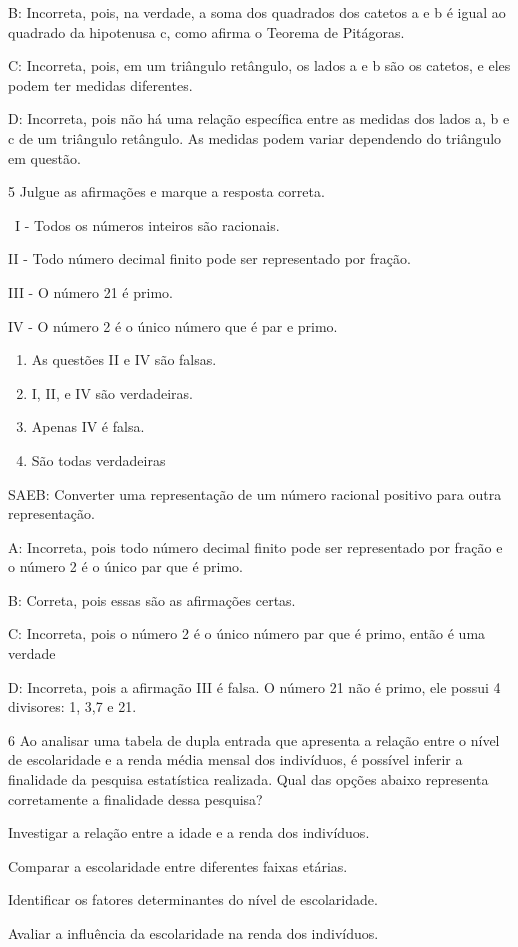 {B: Incorreta, pois, na verdade, a soma dos quadrados dos catetos a e b é
igual ao quadrado da hipotenusa c, como afirma o Teorema de Pitágoras.

C: Incorreta, pois, em um triângulo retângulo, os lados a e b são os
catetos, e eles podem ter medidas diferentes.

D: Incorreta, pois não há uma relação específica entre as medidas dos
lados a, b e c de um triângulo retângulo. As medidas podem variar
dependendo do triângulo em questão.

\num{5} Julgue as afirmações e marque a resposta correta.

~I - Todos os números inteiros são racionais.

II - Todo número decimal finito pode ser representado por fração.

III - O número 21 é primo.

IV - O número 2 é o único número que é par e primo.

\begin{enumerate}
\def\labelenumi{\alph{enumi})}
\item
  As questões II e IV são falsas.
\item
  I, II, e IV são verdadeiras.
\item
  Apenas IV é falsa.
\item
  São todas verdadeiras
\end{enumerate}

SAEB: Converter uma representação de um número racional positivo para
outra representação.

A: Incorreta, pois todo número decimal finito pode ser representado por
fração e o número 2 é o único par que é primo.

B: Correta, pois essas são as afirmações certas.

C: Incorreta, pois o número 2 é o único número par que é primo, então é
uma verdade

D: Incorreta, pois a afirmação III é falsa. O número 21 não é primo, ele
possui 4 divisores: 1, 3,7 e 21.

\num{6} Ao analisar uma tabela de dupla entrada que apresenta a relação entre
o nível de escolaridade e a renda média mensal dos indivíduos, é
possível inferir a finalidade da pesquisa estatística realizada. Qual
das opções abaixo representa corretamente a finalidade dessa pesquisa?
\item Investigar a relação entre a idade e a renda dos indivíduos.
\item Comparar a escolaridade entre diferentes faixas etárias.
\item Identificar os fatores determinantes do nível de escolaridade.
\item Avaliar a influência da escolaridade na renda dos indivíduos.

}
